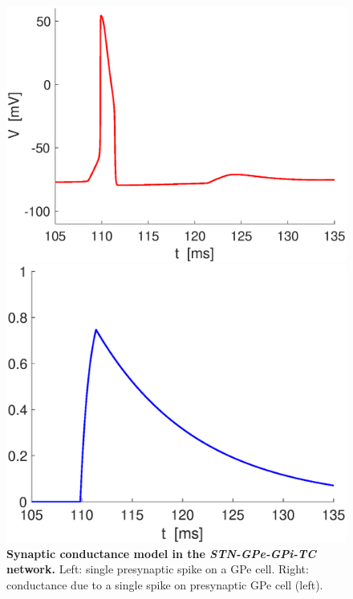\begin{figure}[h]
  \begin{minipage}{0.5\linewidth}
  \begin{center}
\includegraphics[width=1\linewidth]{Images/photo3_1.eps}
\end{center}
  \end{minipage} 
  \begin{minipage}{0.5\linewidth}
  \begin{center}
\includegraphics[width=1\linewidth]{Images/photo3_2.eps}
\end{center}
  \end{minipage} 
  \caption{\textbf{Synaptic conductance model in the \textit{STN-GPe-GPi-TC} network.} Left: single presynaptic spike on a GPe cell. Right: conductance due to a single spike on presynaptic GPe cell (left).}
  \label{photo3}
\end{figure}



